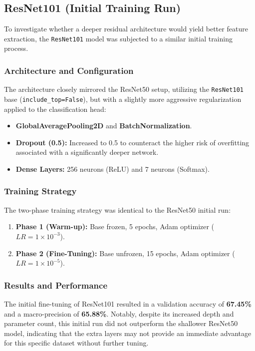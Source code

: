 \documentclass{article}
\begin{document}
\subsection{ResNet101 (Initial Training Run)}
To investigate whether a deeper residual architecture would yield better feature extraction, the \texttt{ResNet101} model was subjected to a similar initial training process.

\subsubsection{Architecture and Configuration}
The architecture closely mirrored the ResNet50 setup, utilizing the \texttt{ResNet101} base (\texttt{include\_top=False}), but with a slightly more aggressive regularization applied to the classification head:
\begin{itemize}
    \item \textbf{GlobalAveragePooling2D} and \textbf{BatchNormalization}.
    \item \textbf{Dropout (0.5):} Increased to 0.5 to counteract the higher risk of overfitting associated with a significantly deeper network.
    \item \textbf{Dense Layers:} 256 neurons (ReLU) and 7 neurons (Softmax).
\end{itemize}

\subsubsection{Training Strategy}
The two-phase training strategy was identical to the ResNet50 initial run:
\begin{enumerate}
    \item \textbf{Phase 1 (Warm-up):} Base frozen, 5 epochs, Adam optimizer ($LR = 1 \times 10^{-3}$).
    \item \textbf{Phase 2 (Fine-Tuning):} Base unfrozen, 15 epochs, Adam optimizer ($LR = 1 \times 10^{-5}$).
\end{enumerate}

\subsubsection{Results and Performance}
The initial fine-tuning of ResNet101 resulted in a validation accuracy of \textbf{67.45\%} and a macro-precision of \textbf{65.88\%}. Notably, despite its increased depth and parameter count, this initial run did not outperform the shallower ResNet50 model, indicating that the extra layers may not provide an immediate advantage for this specific dataset without further tuning.
\end{document}
